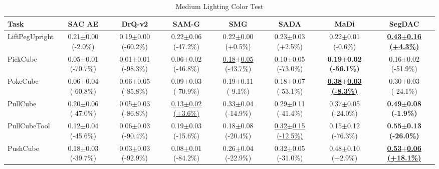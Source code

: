 \begin{table}[htbp]
\centering
\scriptsize
\caption{Medium Lighting Color Test}
\label{tab:appendix_lightingcolortest_medium}
\begin{adjustbox}{max width=\textwidth}
\begin{tabular}{l*{7}{c}}
\toprule
\textbf{Task} & \textbf{SAC AE} & \textbf{DrQ-v2} & \textbf{SAM-G} & \textbf{SMG} & \textbf{SADA} & \textbf{MaDi} & \textbf{SegDAC} \\
\midrule
LiftPegUpright & 0.21$\pm$0.00 \scriptsize{(-2.0\%)} & 0.19$\pm$0.00 \scriptsize{(-60.2\%)} & 0.22$\pm$0.06 \scriptsize{(-47.2\%)} & 0.22$\pm$0.00 \scriptsize{(+0.5\%)} & 0.23$\pm$0.03 \scriptsize{(+2.5\%)} & 0.22$\pm$0.01 \scriptsize{(-0.6\%)} & \textbf{\underline{0.43$\pm$0.16 \scriptsize{(+4.3\%)}}} \\
PickCube & 0.05$\pm$0.01 \scriptsize{(-70.7\%)} & 0.01$\pm$0.01 \scriptsize{(-98.3\%)} & 0.06$\pm$0.02 \scriptsize{(-46.8\%)} & \underline{0.18$\pm$0.05 \scriptsize{(-43.7\%)}} & 0.10$\pm$0.05 \scriptsize{(-73.0\%)} & \textbf{0.19$\pm$0.02 \scriptsize{(-56.1\%)}} & 0.16$\pm$0.02 \scriptsize{(-51.9\%)} \\
PokeCube & 0.06$\pm$0.04 \scriptsize{(-60.8\%)} & 0.06$\pm$0.05 \scriptsize{(-85.8\%)} & 0.09$\pm$0.03 \scriptsize{(-70.9\%)} & 0.19$\pm$0.11 \scriptsize{(-9.1\%)} & 0.18$\pm$0.07 \scriptsize{(-53.1\%)} & \textbf{\underline{0.38$\pm$0.03 \scriptsize{(-8.3\%)}}} & 0.30$\pm$0.03 \scriptsize{(-24.1\%)} \\
PullCube & 0.20$\pm$0.06 \scriptsize{(-47.0\%)} & 0.05$\pm$0.03 \scriptsize{(-86.8\%)} & \underline{0.13$\pm$0.02 \scriptsize{(+3.6\%)}} & 0.33$\pm$0.04 \scriptsize{(-14.9\%)} & 0.29$\pm$0.11 \scriptsize{(-41.4\%)} & 0.37$\pm$0.05 \scriptsize{(-24.0\%)} & \textbf{0.49$\pm$0.08 \scriptsize{(-1.9\%)}} \\
PullCubeTool & 0.12$\pm$0.04 \scriptsize{(-45.6\%)} & 0.06$\pm$0.03 \scriptsize{(-90.4\%)} & 0.19$\pm$0.03 \scriptsize{(-15.6\%)} & 0.18$\pm$0.08 \scriptsize{(-20.4\%)} & \underline{0.32$\pm$0.15 \scriptsize{(-12.5\%)}} & 0.15$\pm$0.12 \scriptsize{(-76.3\%)} & \textbf{0.55$\pm$0.13 \scriptsize{(-26.0\%)}} \\
PushCube & 0.18$\pm$0.03 \scriptsize{(-39.7\%)} & 0.03$\pm$0.03 \scriptsize{(-92.9\%)} & 0.08$\pm$0.01 \scriptsize{(-84.2\%)} & 0.26$\pm$0.04 \scriptsize{(-22.9\%)} & 0.32$\pm$0.05 \scriptsize{(-31.0\%)} & 0.48$\pm$0.10 \scriptsize{(+2.9\%)} & \textbf{\underline{0.53$\pm$0.06 \scriptsize{(+18.1\%)}}} \\

\end{tabular}
\end{adjustbox}
\end{table}
